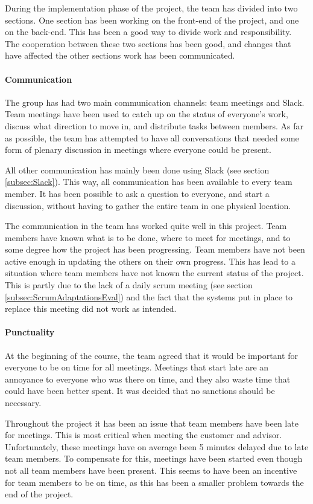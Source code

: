 \documentclass[11pt,a4paper,titlepage,oneside]{report}
\begin{document}
During the implementation phase of the project, the team has divided into two sections. One section has been working on the \gls{front-end} of the project, and one on the \gls{back-end}. This has been a good way to divide work and responsibility. The cooperation between these two sections has been good, and changes that have affected the other sections work has been communicated. 

\paragraph{Communication}
The group has had two main communication channels: team meetings and Slack. Team meetings have been used to catch up on the status of everyone's work, discuss what direction to move in, and distribute tasks between members. As far as possible, the team has attempted to have all conversations that needed some form of plenary discussion in meetings where everyone could be present.

All other communication has mainly been done using Slack (see section \ref{subsec:Slack}). This way, all communication has been available to every team member. It has been possible to ask a question to everyone, and start a discussion, without having to gather the entire team in one physical location.

The communication in the team has worked quite well in this project. Team members have known what is to be done, where to meet for meetings, and to some degree how the project has been progressing. Team members have not been active enough in updating the others on their own progress. This has lead to a situation where team members have not known the current status of the project. This is partly due to the lack of a daily scrum meeting (see section \ref{subsec:ScrumAdaptationsEval}) and the fact that the systems put in place to replace this meeting did not work as intended.

\paragraph{Punctuality}
At the beginning of the course, the team agreed that it would be important for everyone to be on time for all meetings. Meetings that start late are an annoyance to everyone who was there on time, and they also waste time that could have been better spent. It was decided that no sanctions should be necessary.

Throughout the project it has been an issue that team members have been late for meetings. This is most critical when meeting the customer and advisor. Unfortunately, these meetings have on average been 5 minutes delayed due to late team members. To compensate for this, meetings have been started even though not all team members have been present. This seems to have been an incentive for team members to be on time, as this has been a smaller problem towards the end of the project. 
\end{document}
